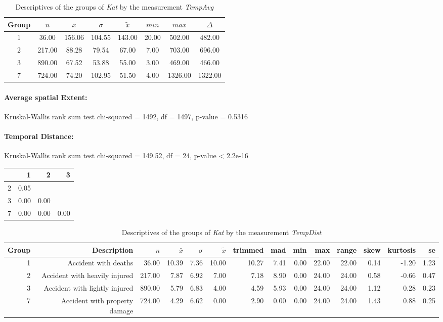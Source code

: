 \begin{table}[ht]
	\small
	\centering
	\begin{tabular}{c|c|c|c|c|c|c|c}
	  	\toprule
		Group & $n$ & $\bar{x}$ & $\sigma$ & $\tilde{x}$ & $min$ & $max$ & $\Delta$ \\ 
	  	\midrule
		1 &  36.00 & 156.06 & 104.55 & 143.00 & 20.00 & 502.00 & 482.00 \\ 
	  	2 & 217.00 & 88.28 & 79.54 & 67.00 & 7.00 & 703.00 & 696.00 \\ 
	  	3 & 890.00 & 67.52 & 53.88 & 55.00 & 3.00 & 469.00 & 466.00 \\ 
	  	7 & 724.00 & 74.20 & 102.95 & 51.50 & 4.00 & 1326.00 & 1322.00 \\ 
	   	\bottomrule
	\end{tabular}
	\caption{Descriptives of the groups of \textit{Kat} by the measurement \textit{TempAvg}}
\end{table}

\paragraph{Average spatial Extent:}
Kruskal-Wallis rank sum test chi-squared = 1492, df = 1497, p-value = 0.5316

\paragraph{Temporal Distance:}
Kruskal-Wallis rank sum test chi-squared = 149.52, df = 24, p-value < 2.2e-16

\begin{tabular}{rrrr}
  	\toprule
 	& 1 & 2 & 3 \\ 
  	\midrule
	2 & 0.05 &  &  \\ 
  	3 & 0.00 & 0.00 &  \\ 
  	7 & 0.00 & 0.00 & 0.00 \\ 
   	\bottomrule
\end{tabular}

\begin{table}[ht]
	\small
	\centering
	\begin{tabular}{rrrrrrrrrrrrrr}
	  	\toprule
		Group & Description & $n$ & $\bar{x}$ & $\sigma$ & $\tilde{x}$ & trimmed & mad & min & max & range & skew & kurtosis & se \\ 
	  	\midrule
		1 & Accident with deaths & 36.00 & 10.39 & 7.36 & 10.00 & 10.27 & 7.41 & 0.00 & 22.00 & 22.00 & 0.14 & -1.20 & 1.23 \\ 
	  	2 & Accident with heavily injured & 217.00 & 7.87 & 6.92 & 7.00 & 7.18 & 8.90 & 0.00 & 24.00 & 24.00 & 0.58 & -0.66 & 0.47 \\ 
	  	3 & Accident with lightly injured & 890.00 & 5.79 & 6.83 & 4.00 & 4.59 & 5.93 & 0.00 & 24.00 & 24.00 & 1.12 & 0.28 & 0.23 \\ 
	  	7 & Accident with property damage & 724.00 & 4.29 & 6.62 & 0.00 & 2.90 & 0.00 & 0.00 & 24.00 & 24.00 & 1.43 & 0.88 & 0.25 \\ 
	   	\bottomrule
	\end{tabular}
	\caption{Descriptives of the groups of \textit{Kat} by the measurement \textit{TempDist}}
\end{table}

